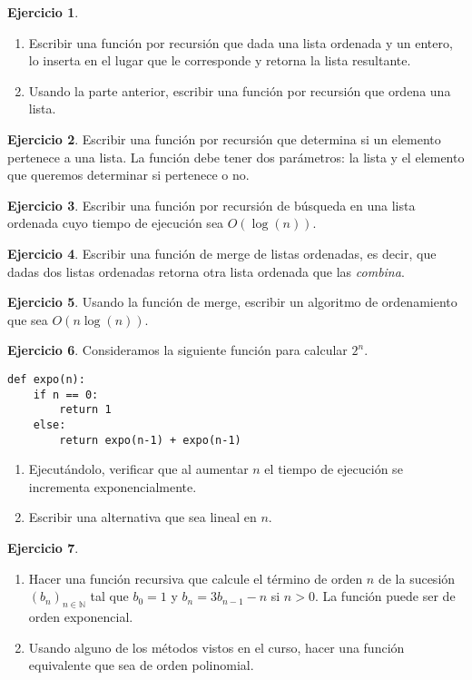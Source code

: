 \documentclass[a4paper,12pt]{book}
\newcommand{\N}{\mathbb{N}}
\theoremstyle{definition}
\newtheorem{ejercicio}{Ejercicio}
\begin{document}
	\begin{ejercicio}
		\begin{enumerate}\parskip-.5ex
			\item Escribir una función por recursión que dada una lista ordenada y un entero, lo inserta en el lugar que le corresponde y retorna la lista resultante.
			\item Usando la parte anterior, escribir una función por recursión que ordena una lista.
		\end{enumerate}
	\end{ejercicio}
	
	\begin{ejercicio}
		Escribir una función por recursión que determina si un elemento pertenece a una lista. La función debe tener dos parámetros: la lista y el elemento que queremos determinar si pertenece o no.
	\end{ejercicio}
	
	\begin{ejercicio}
		Escribir una función por recursión de búsqueda en una lista ordenada cuyo tiempo de ejecución sea $O(\log(n))$.
	\end{ejercicio}
	
	\begin{ejercicio}
		Escribir una función de merge de listas ordenadas, es decir, que dadas dos listas ordenadas retorna otra lista ordenada que las {\sl combina}.
	\end{ejercicio}
	
	\begin{ejercicio}
		Usando la función de merge, escribir un algoritmo de ordenamiento que sea $O(n\log(n))$.
	\end{ejercicio}
	
	\begin{ejercicio}
		Consideramos la siguiente función para calcular $2^n$.
		\begin{verbatim}
def expo(n):
    if n == 0:
        return 1
    else:
        return expo(n-1) + expo(n-1)
		\end{verbatim}
		\begin{enumerate}\parskip-.5ex
			\item Ejecutándolo, verificar que al aumentar $n$ el tiempo de ejecución se incrementa exponencialmente.
			\item Escribir una alternativa que sea lineal en $n$.
		\end{enumerate}
	\end{ejercicio}
	
	\begin{ejercicio}
		\begin{enumerate}\parskip-.5ex
			\item Hacer una función recursiva que calcule el término de orden $n$ de la sucesión $(b_n)_{n\in\N}$ tal que $b_0=1$ y $b_n= 3b_{n-1} - n$ si $n>0$. La función puede ser de orden exponencial.
			\item Usando alguno de los métodos vistos en el curso, hacer una función equivalente que sea de orden polinomial.
		\end{enumerate}
	\end{ejercicio}
	
\end{document}
